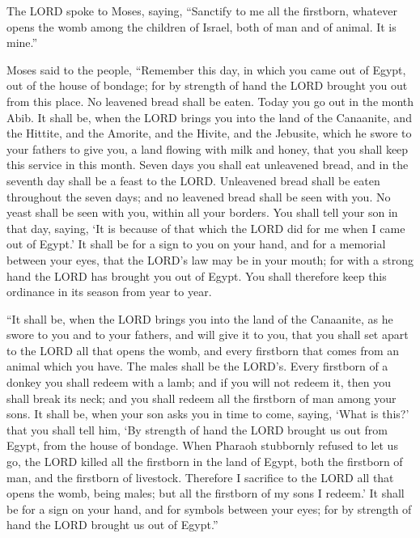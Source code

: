 \mychapter{} \myverse*{}The LORD spoke to Moses, saying, \myverse{}“Sanctify to me all the firstborn, whatever opens the womb among the children of Israel, both of man and of animal. It is mine.”


\myverse{}Moses said to the people, “Remember this day, in which you came out of Egypt, out of the house of bondage; for by strength of hand the LORD brought you out from this place. No leavened bread shall be eaten. \myverse{}Today you go out in the month Abib. \myverse{}It shall be, when the LORD brings you into the land of the Canaanite, and the Hittite, and the Amorite, and the Hivite, and the Jebusite, which he swore to your fathers to give you, a land flowing with milk and honey, that you shall keep this service in this month. \myverse{}Seven days you shall eat unleavened bread, and in the seventh day shall be a feast to the LORD. \myverse{}Unleavened bread shall be eaten throughout the seven days; and no leavened bread shall be seen with you. No yeast shall be seen with you, within all your borders. \myverse{}You shall tell your son in that day, saying, ‘It is because of that which the LORD did for me when I came out of Egypt.’ \myverse{}It shall be for a sign to you on your hand, and for a memorial between your eyes, that the LORD’s law may be in your mouth; for with a strong hand the LORD has brought you out of Egypt. \myverse{}You shall therefore keep this ordinance in its season from year to year.


\myverse{}“It shall be, when the LORD brings you into the land of the
Canaanite, as he swore to you and to your fathers, and will give it to you,
\myverse{}that you shall set apart to the LORD all that opens the womb, and every firstborn
that comes from an animal which you have. The males shall be the LORD’s.
\myverse{}Every firstborn of a donkey you shall redeem with a lamb; and if you will
not redeem it, then you shall break its neck; and you shall redeem all the firstborn of man among your
sons.
\myverse{}It shall be, when your son asks you in time to come, saying, ‘What is this?’
that you shall tell him, ‘By strength of hand the LORD brought us out from Egypt, from the house of bondage.
\myverse{}When Pharaoh stubbornly refused to let us go, the LORD killed all the firstborn
in the land of Egypt, both the firstborn of man, and the firstborn of livestock. Therefore I sacrifice
to the LORD all that opens the womb, being males; but all the firstborn of my sons I redeem.’
\myverse{}It shall be for a sign on your hand, and for symbols between your eyes; for
by strength of hand the LORD brought us out of Egypt.”



